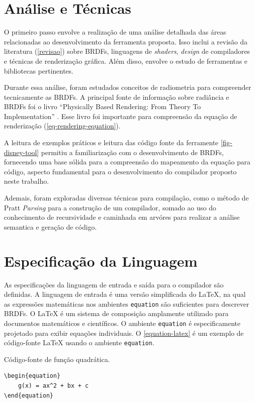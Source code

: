 \section{Análise e Técnicas} \label{analise}


O primeiro passo envolve a realização de uma análise detalhada das áreas relacionadas ao desenvolvimento da ferramenta proposta. Isso inclui a revisão da literatura (\autoref{revisao}) sobre BRDFs, linguagens de \textit{shaders}, \textit{design} de compiladores e técnicas de renderização gráfica. Além disso, envolve o estudo de ferramentas e bibliotecas pertinentes.

Durante essa análise, foram estudados conceitos de radiometria para compreender tecnicamente as BRDFs. A principal fonte de informação sobre radiância e BRDFs foi o livro ``Physically Based Rendering: From Theory To Implementation'' \cite{pbr}. Esse livro foi importante para compreensão da equação de renderização (\autoref{eq-rendering-equation}).

A leitura de exemplos práticos e leitura das código fonte da ferramente \autoref{fig-disney-tool} permitiu a familiarização com o desenvolvimento de BRDFs, fornecendo uma base sólida para a compreensão do mapeamento da equação para código, aspecto fundamental para o desenvolvimento do compilador proposto neste trabalho.

Ademais, foram exploradas diversas técnicas para compilação, como o método de Pratt \textit{Parsing} para a construção de um compilador, somado ao uso do conhecimento de recursividade e caminhada em arvóres para realizar a análise semantica e geração de código.


\section{Especificação da Linguagem}\label{especificacao-linguagem}

As especificações da linguagem de entrada e saída para o compilador são definidas. A linguagem de entrada é uma versão simplificada do \LaTeX{}, na qual as expressões matemáticas nos ambientes \texttt{equation} são suficientes para descrever BRDFs. O \LaTeX{}  é um sistema de composição amplamente utilizado para documentos matemáticos e científicos. O ambiente \texttt{equation} é especificamente projetado para exibir equações individuais. O \autoref{equation-latex} é um exemplo de código-fonte \LaTeX{}  usando o ambiente \texttt{equation}.


\begin{codigo}[H]
\caption{\small Código-fonte de função quadrática.}
\label{equation-latex}
\begin{lstlisting}
\begin{equation}
    g(x) = ax^2 + bx + c
\end{equation}
\end{lstlisting}
\end{codigo}




